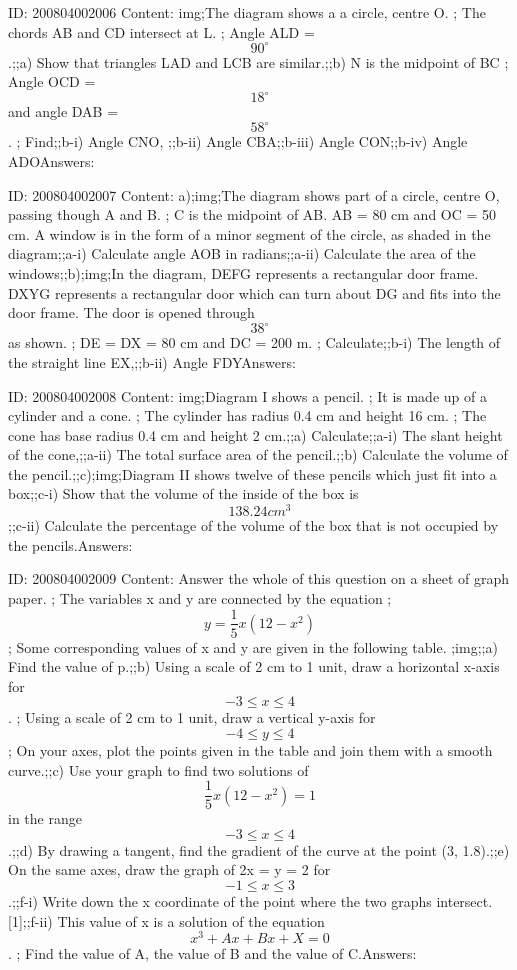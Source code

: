 \documentclass{article}
\begin{document}
ID: 200804002006
Content:
img;The diagram shows a a circle, centre O. ; The chords AB and CD intersect at L. ; Angle ALD = $$90^{\circ}$$.;;a) Show that triangles LAD and LCB are similar.;;b) N is the midpoint of BC ; Angle OCD = $$18^{\circ}$$ and angle DAB = $$58^{\circ}$$. ; Find;;b-i) Angle CNO, ;;b-ii) Angle CBA;;b-iii) Angle CON;;b-iv) Angle ADOAnswers:

ID: 200804002007
Content:
a);img;The diagram shows part of a circle, centre O, passing though A and B. ; C is the midpoint of AB. AB = 80 cm and OC = 50 cm. A window is in the form of a minor segment of the circle, as shaded in the diagram;;a-i) Calculate angle AOB in radians;;a-ii) Calculate the area of the windows;;b);img;In the diagram, DEFG represents a rectangular door frame. DXYG represents a rectangular door which can turn about DG and fits into the door frame. The door is opened through $$38^{\circ}$$ as shown. ; DE = DX = 80 cm and DC = 200 m. ; Calculate;;b-i) The length of the straight line EX,;;b-ii) Angle FDYAnswers:

ID: 200804002008
Content:
img;Diagram I shows a pencil. ; It is made up of a cylinder and a cone. ; The cylinder has radius 0.4 cm and height 16 cm. ; The cone has base radius 0.4 cm and height 2 cm.;;a) Calculate;;a-i) The slant height of the cone,;;a-ii) The total surface area of the pencil.;;b) Calculate the volume of the pencil.;;c);img;Diagram II shows twelve of these pencils which just fit into a box;;c-i) Show that the volume of the inside of the box is $$138.24 cm^3$$;;c-ii) Calculate the percentage of the volume of the box that is not occupied by the pencils.Answers:

ID: 200804002009
Content:
Answer the whole of this question on a sheet of graph paper. ; The variables x and y are connected by the equation ; $$y = \frac{1}{5}x(12 - x^2)$$ ; Some corresponding values of x and y are given in the following table. ;img;;a) Find the value of p.;;b) Using a scale of 2 cm to 1 unit, draw a horizontal x-axis for $$-3 \leq x \leq 4$$. ; Using a scale of 2 cm to 1 unit, draw a vertical y-axis for $$-4 \leq y \leq 4$$ ; On your axes, plot the points given in the table and join them with a smooth curve.;;c) Use your graph to find two solutions of $$\frac{1}{5}x(12 - x^2) = 1$$ in the range $$-3 \leq x \leq 4$$.;;d) By drawing a tangent, find the gradient of the curve at the point (3, 1.8).;;e) On the same axes, draw the graph of 2x = y = 2 for $$-1 \leq x \leq 3$$.;;f-i) Write down the x coordinate of the point where the two graphs intersect.   [1];;f-ii) This value of x is a solution of the equation $$x^3 + Ax + Bx + X = 0$$. ; Find the value of A, the value of B and the value of C.Answers:
\end{document}
